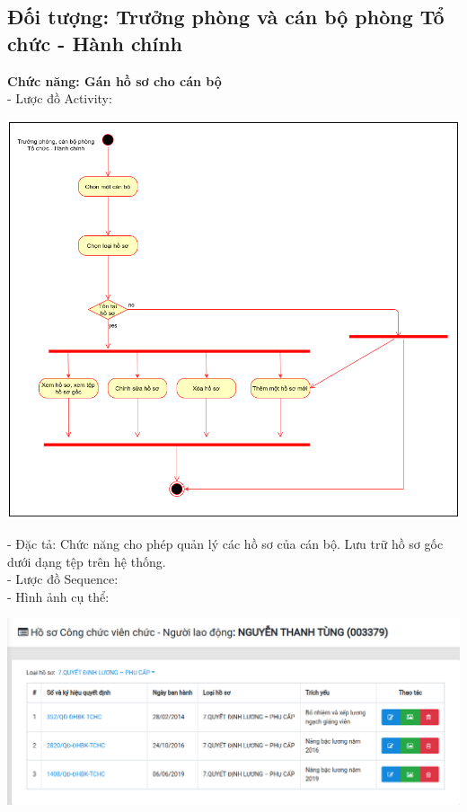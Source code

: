 \subsection{Đối tượng: Trưởng phòng và cán bộ phòng Tổ chức - Hành chính}
\textbf{Chức năng: Gán hồ sơ cho cán bộ}\\
- Lược đồ Activity:
\begin{center}
  \captionsetup{type=figure}
  \includegraphics[scale=0.5]{img/UML/Manager/activityQuanLyHoSo.png}
\end{center}
- Đặc tả: Chức năng cho phép quản lý các hồ sơ của cán bộ. Lưu trữ hồ sơ gốc dưới dạng tệp trên hệ thống.\\
- Lược đồ Sequence: \\
- Hình ảnh cụ thể: 
\begin{center}
  \captionsetup{type=figure}
  \includegraphics[scale=0.5]{img/Screen/qlhoso.png}
\end{center}
